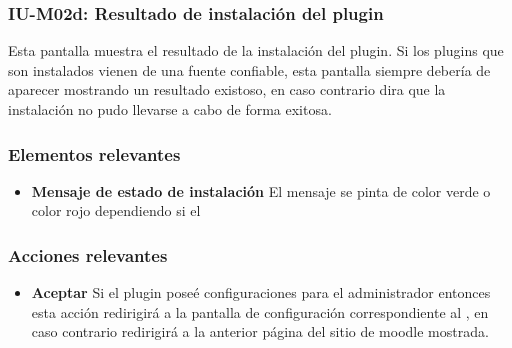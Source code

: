 
\subsubsection{IU-M02d: Resultado de instalación del plugin}

 Esta pantalla muestra el resultado de la instalación del plugin. Si los plugins
 que son instalados vienen de una fuente confiable, esta pantalla siempre debería
 de aparecer mostrando un resultado existoso, en caso contrario dira que la instalación
 no pudo llevarse a cabo de forma exitosa.


\subsubsection{Elementos relevantes}

    \begin{itemize}
    \item {\bf Mensaje de estado de instalación}
        El mensaje se pinta de color verde o color rojo dependiendo si el
    \end{itemize}

\subsubsection{Acciones relevantes}

    \begin{itemize}
    \item {\bf Aceptar}
        Si el plugin poseé configuraciones para el administrador entonces esta acción
        redirigirá a la pantalla de configuración correspondiente al ,
        en caso contrario redirigirá a la anterior página del sitio de moodle mostrada.
    \end{itemize}

\clearpage

